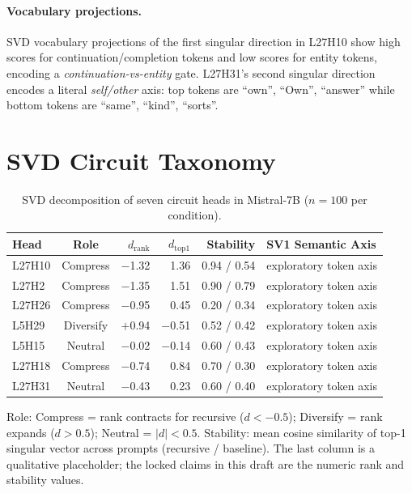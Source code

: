 \documentclass{article}
\newcommand{\dcohen}{d}
\begin{document}
\paragraph{Vocabulary projections.}
SVD vocabulary projections of the first singular direction in L27H10 show high scores for
continuation/completion tokens and low scores for entity tokens, encoding a
\emph{continuation-vs-entity} gate.
L27H31's second singular direction encodes a literal \emph{self/other} axis:
top tokens are ``own'', ``Own'', ``answer'' while bottom tokens are ``same'', ``kind'', ``sorts''.


\section{SVD Circuit Taxonomy}
\label{app:svd_taxonomy}

\begin{table}[h]
\centering
\caption{SVD decomposition of seven circuit heads in Mistral-7B ($n = 100$ per condition).}
\label{tab:svd_heads}
\small
\begin{tabular}{lcrrrl}
\toprule
Head & Role & $\dcohen_{\text{rank}}$ & $\dcohen_{\text{top1}}$ & Stability & SV1 Semantic Axis \\
\midrule
L27H10 & Compress & $-$1.32 & 1.36 & 0.94 / 0.54 & exploratory token axis \\
L27H2  & Compress & $-$1.35 & 1.51 & 0.90 / 0.79 & exploratory token axis \\
L27H26 & Compress & $-$0.95 & 0.45 & 0.20 / 0.34 & exploratory token axis \\
L5H29  & Diversify & $+$0.94 & $-$0.51 & 0.52 / 0.42 & exploratory token axis \\
L5H15  & Neutral & $-$0.02 & $-$0.14 & 0.60 / 0.43 & exploratory token axis \\
L27H18 & Compress & $-$0.74 & 0.84 & 0.70 / 0.30 & exploratory token axis \\
L27H31 & Neutral & $-$0.43 & 0.23 & 0.60 / 0.40 & exploratory token axis \\
\bottomrule
\end{tabular}
\vspace{1mm}

\raggedright\footnotesize
Role: Compress = rank contracts for recursive ($\dcohen < -0.5$);
Diversify = rank expands ($\dcohen > 0.5$);
Neutral = $|\dcohen| < 0.5$.
Stability: mean cosine similarity of top-1 singular vector across prompts (recursive / baseline).
The last column is a qualitative placeholder; the locked claims in this draft are the numeric rank and stability values.
\end{table}
\end{document}

